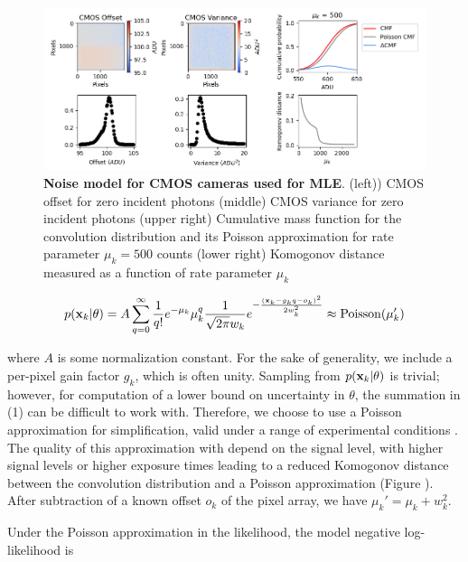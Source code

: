 \begin{figure}[t]
\begin{center}
\includegraphics[width=16cm]{media/Noise.png}
\end{center}
\caption{\textbf{Noise model for CMOS cameras used for MLE}. (left)) CMOS offset for zero incident photons (middle) CMOS variance for zero incident photons (upper right) Cumulative mass function for the convolution distribution and its Poisson approximation for rate parameter $\mu_{k} = 500$ counts (lower right) Komogonov distance measured as a function of rate parameter $\mu_{k}$}
\label{fig:fig2}
\end{figure}

\begin{equation}
p(\bold{x}_{k}\lvert\theta) = A\sum_{q=0}^{\infty} \frac{1}{q!}e^{-\mu_{k}}\mu_{k}^{q}\frac{1}{\sqrt{2\pi}w_{k}}e^{-\frac{(\bold{x}_{k}-g_{k}q-o_{k})^2}{2 w_{k}^{2}}} \approx \mathrm{Poisson}(\mu_{k}')
\end{equation}

where $A$ is some normalization constant. For the sake of generality, we include a per-pixel gain factor $g_{k}$, which is often unity. Sampling from $p(\bold{x}_{k}\lvert\theta)$ is trivial; however, for computation of a lower bound on uncertainty in $\theta$, the summation in (1) can be difficult to work with. Therefore, we choose to use a Poisson approximation for simplification, valid under a range of experimental conditions \parencite{Huang2013}. The quality of this approximation with depend on the signal level, with higher signal levels or higher exposure times leading to a reduced Komogonov distance between the convolution distribution and a Poisson approximation (Figure \label{fig:fig2}). After subtraction of a known offset $o_{k}$ of the pixel array, we have $\mu_{k}' = \mu_{k} + w_{k}^{2}$.

Under the Poisson approximation in the likelihood, the model negative log-likelihood is

